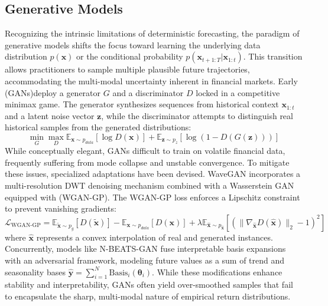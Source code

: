 \subsection{Generative Models}

Recognizing the intrinsic limitations of deterministic forecasting, the paradigm of generative models shifts the focus toward learning the underlying data distribution $p(\mathbf{x})$ or the conditional probability $p(\mathbf{x}_{t+1:T}|\mathbf{x}_{1:t})$. This transition allows practitioners to sample multiple plausible future trajectories, accommodating the multi-modal uncertainty inherent in financial markets. Early (GANs)deploy a generator $G$ and a discriminator $D$ locked in a competitive minimax game. The generator synthesizes sequences from historical context $\mathbf{x}_{1:t}$ and a latent noise vector $\mathbf{z}$, while the discriminator attempts to distinguish real historical samples from the generated distributions:
\begin{equation}
\min_G \max_D \mathbb{E}_{\mathbf{x} \sim p_{data}}[\log D(\mathbf{x})] + \mathbb{E}_{\mathbf{z} \sim p_z}[\log(1 - D(G(\mathbf{z})))]
\end{equation}
While conceptually elegant, GANs difficult to train on volatile financial data, frequently suffering from mode collapse and unstable convergence. To mitigate these issues, specialized adaptations have been devised. WaveGAN \citep{dai2024wavegan} incorporates a multi-resolution DWT denoising mechanism combined with a Wasserstein GAN equipped with (WGAN-GP). The WGAN-GP loss enforces a Lipschitz constraint to prevent vanishing gradients:
\begin{equation}
\mathcal{L}_{\text{WGAN-GP}} = \mathbb{E}_{\tilde{\mathbf{x}} \sim p_g}[D(\tilde{\mathbf{x}})] - \mathbb{E}_{\mathbf{x} \sim p_{data}}[D(\mathbf{x})] + \lambda \mathbb{E}_{\hat{\mathbf{x}} \sim p_{\hat{\mathbf{x}}}}[(\|\nabla_{\hat{\mathbf{x}}} D(\hat{\mathbf{x}})\|_2 - 1)^2]
\end{equation}
where $\hat{\mathbf{x}}$ represents a convex interpolation of real and generated instances. Concurrently, models like N-BEATS-GAN \citep{dai2026nbeats} fuse interpretable basis expansions \citep{oreshkin2020nbeats} with an adversarial framework, modeling future values as a sum of trend and seasonality bases $\hat{\mathbf{y}} = \sum_{i=1}^N \text{Basis}_i(\boldsymbol{\theta}_i)$. While these modifications enhance stability and interpretability, GANs often yield over-smoothed samples that fail to encapsulate the sharp, multi-modal nature of empirical return distributions.

